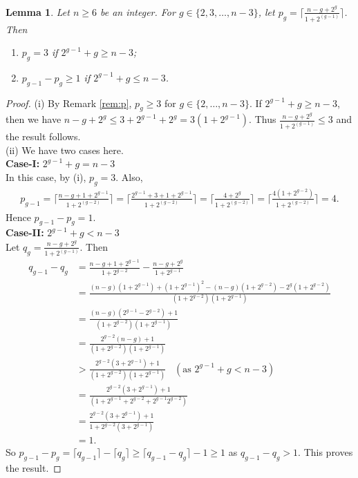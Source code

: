 \documentclass[10pt,a4paper]{amsart}
\newtheorem{lemma}[theorem]{Lemma}
\begin{document}
\begin{lemma}\label{lem:cc1}
Let $n\geq 6$ be an integer. For $g\in \{2,3,\ldots,n-3\}$, let $p_g=\lceil \frac{n-g+2^g}{1+2^{(g-1)}} \rceil$. Then
\begin{enumerate}
\item[(i)] $p_g=3$ if  $2^{g-1}+g\geq n-3$;
\item[(ii)] $p_{g-1}- p_{g}\geq 1$ if  $2^{g-1}+g\leq n-3$.
\end{enumerate}
\end{lemma}
\begin{proof}
(i) By Remark \ref{rem:p}, $p_g\geq 3$ for $g\in \{2,\ldots,n-3\}$. If $2^{g-1}+g\geq n-3$, then we have $n-g+2^g\leq 3+2^{g-1}+2^g=3(1+2^{g-1})$. Thus $\frac{n-g+2^g}{1+2^{(g-1)}} \leq 3$ and the result follows.\\

(ii) We have two cases here.\\
\textbf{Case-I:}  $2^{g-1}+g= n-3$\\
In this case, by (i),  $p_g=3$. Also, 
\begin{align*}
 p_{g-1}=\lceil \frac{n-g+1+2^{g-1}}{1+2^{(g-2)}} \rceil=\lceil \frac{2^{g-1}+3+1+2^{g-1}}{1+2^{(g-2)}} \rceil=\lceil \frac{4+2^{g}}{1+2^{(g-2)}}\rceil=\lceil \frac{4(1+2^{g-2})}{1+2^{(g-2)}} \rceil=4.
\end{align*}
Hence $p_{g-1}-p_{g}=1$.\\

\textbf{Case-II:} $2^{g-1}+g< n-3$ \\
Let $q_g=\frac{n-g+2^g}{1+2^{(g-1)}}$. Then 
\begin{align*}
 q_{g-1}-q_g&= \frac{n-g+1+2^{g-1}}{1+2^{g-2}}-\frac{n-g+2^g}{1+2^{g-1}}\\
            &=\frac{(n-g)(1+2^{g-1})+(1+2^{g-1})^2-(n-g)(1+2^{g-2})-2^g(1+2^{g-2})}{(1+2^{g-2})(1+2^{g-1})}\\
            &=\frac{(n-g)(2^{g-1}-2^{g-2})+1}{(1+2^{g-2})(1+2^{g-1})}\\
            &=\frac{2^{g-2}(n-g)+1}{(1+2^{g-2})(1+2^{g-1})}\\
            &>\frac{2^{g-2}(3+2^{g-1})+1}{(1+2^{g-2})(1+2^{g-1})}\;\;\;(\mbox{as $2^{g-1}+g< n-3$})\\
            &=\frac{2^{g-2}(3+2^{g-1})+1}{(1+2^{g-1}+2^{g-2}+2^{g-1}2^{g-2})}\\
            &=\frac{2^{g-2}(3+2^{g-1})+1}{1+2^{g-2}(3+2^{g-1})}\\
            &=1.
\end{align*}
So $p_{g-1}-p_{g}=\lceil q_{g-1} \rceil-\lceil q_g \rceil \geq \lceil q_{g-1}-q_{g}\rceil-1\geq 1$ as $q_{g-1}-q_g > 1$. This proves the result.
\end{proof}
\end{document}
